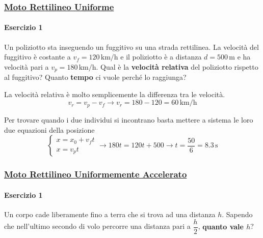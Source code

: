 \subsubsection*{\hyperref[subsec:cinematica:mru]{Moto Rettilineo Uniforme}}\label{ex:mru}
\paragraph{Esercizio 1}
Un poliziotto sta inseguendo un fuggitivo su una strada rettilinea. La velocità del fuggitivo è 
costante a $v_f = 120\,\text{km/h}$ e il poliziotto è a distanza $d=500\,\text{m}$ e ha velocità
pari a $v_p = 180\,\text{km/h}$. Qual è la \textbf{velocità relativa} del poliziotto rispetto al
fuggitivo? Quanto \textbf{tempo} ci vuole perché lo raggiunga?

\divisor

La velocità relativa è molto semplicemente la differenza tra le velocità.
\begin{equation*}
  v_r = v_p-v_f \rightarrow v_r = 180-120 = \boxed{60\,\text{km/h}}
\end{equation*}

Per trovare quando i due individui si incontrano basta mettere a sistema le loro due equazioni
della posizione
\begin{equation*}
  \begin{cases}
    x = x_0 + v_ft\\x = v_pt
  \end{cases}\rightarrow
  180t = 120t + 500 \rightarrow t = \frac{50}{6} = \boxed{8.3\,\text{s}}
\end{equation*}

\subsubsection*{\hyperref[subsec:cinematica:mrua]{Moto Rettilineo Uniformemente Accelerato}}
\label{ex:mrua}

\paragraph{Esercizio 1}
Un corpo cade liberamente fino a terra che si trova ad una distanza $h$. Sapendo che nell'ultimo 
secondo di volo percorre una distanza pari a $\dfrac{h}{2}$, \textbf{quanto vale $h$}?

\divisor

